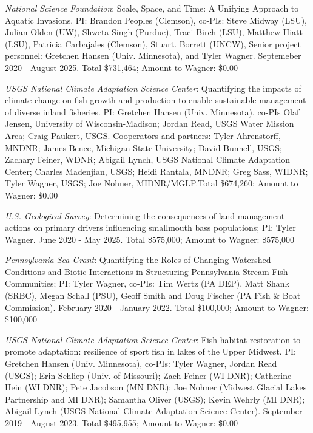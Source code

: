 \documentclass[10pt]{article}
\begin{document}
\begin{flushleft}
\begin{etaremune}
\item \textit{National Science Foundation}: Scale, Space, and Time: A Unifying Approach to Aquatic Invasions. PI: Brandon Peoples (Clemson), co-PIs: Steve Midway (LSU), Julian Olden (UW), Shweta
 Singh (Purdue), Traci Birch (LSU), Matthew Hiatt (LSU), Patricia Carbajales (Clemson), Stuart. Borrett (UNCW), Senior project personnel: Gretchen Hansen (Univ. Minnesota), and Tyler Wagner. Septemeber 2020 - August 2025. Total \$731,464; Amount to Wagner: \$0.00


\item {\sl USGS National Climate Adaptation Science Center}: Quantifying the impacts of climate change on fish growth and production to enable sustainable management of diverse inland fisheries. PI: Gretchen Hansen (Univ. Minnesota). co-PIs Olaf Jensen, University of Wisconsin-Madison; Jordan Read, USGS Water Mission Area; Craig Paukert, USGS. Cooperators and partners: Tyler Ahrenstorff, MNDNR; James Bence, Michigan State University; David Bunnell, USGS; Zachary Feiner, WDNR; Abigail Lynch, USGS National Climate Adaptation Center; Charles Madenjian, USGS; Heidi Rantala, MNDNR; Greg Sass, WIDNR; Tyler Wagner, USGS; Joe Nohner, MIDNR/MGLP.Total \$674,260; Amount to Wagner: \$0.00

\item {\sl U.S. Geological Survey}: Determining the consequences of land management actions on primary drivers influencing smallmouth bass populations; PI: Tyler Wagner. June 2020 - May 2025. Total \$575,000; Amount to Wagner: \$575,000

\item {\sl Pennsylvania Sea Grant}: Quantifying the Roles of Changing Watershed Conditions and Biotic Interactions in Structuring Pennsylvania Stream Fish Communities; PI: Tyler Wagner, co-PIs: Tim Wertz (PA DEP), Matt Shank (SRBC), Megan Schall (PSU), Geoff Smith and Doug Fischer (PA Fish \& Boat Commission). February 2020 - January 2022. Total \$100,000; Amount to Wagner: \$100,000

\item  {\sl USGS National Climate Adaptation Science Center}: Fish habitat restoration to promote adaptation: resilience of sport fish in lakes of the Upper Midwest. PI: Gretchen Hansen (Univ. Minnesota), co-PIs: Tyler Wagner, Jordan Read (USGS); Erin Schliep (Univ. of Missouri); Zach Feiner (WI DNR); Catherine Hein (WI DNR); Pete Jacobson (MN DNR); Joe Nohner (Midwest Glacial Lakes Partnership and MI DNR); Samantha Oliver (USGS); Kevin Wehrly (MI DNR); Abigail Lynch (USGS National Climate Adaptation Science Center). September 2019 - August 2023. Total \$495,955; Amount to Wagner: \$0.00


\end{etaremune}
\end{flushleft}
\end{document}
